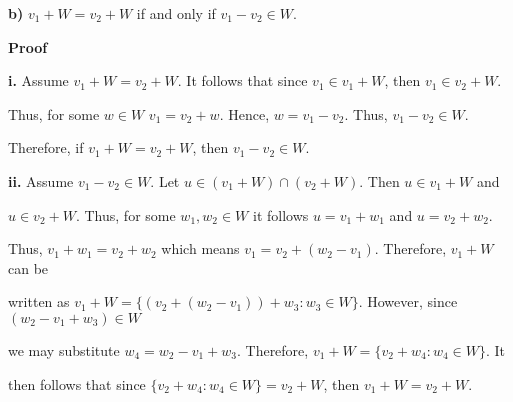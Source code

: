 \documentclass[12pt, a4paper]{article}
\begin{document}
\newpage

\par\textbf{b)} $v_1+W=v_2+W$ if and only if $v_1-v_2\in W$.\par

\vspace{4mm}

\textbf{Proof}\par

\vspace{2mm}

\hspace{4mm}\textbf{i.} Assume $v_1+W=v_2+W$. It follows that since $v_1\in v_1+W$, then $v_1\in v_2+W$.\par Thus, for some $w\in W$ $v_1=v_2+w$. Hence, $w=v_1-v_2$. Thus, $v_1-v_2\in W$.\par Therefore, if $v_1+W=v_2+W$, then $v_1-v_2\in W$.

\vspace{4mm}

\par\hspace{4mm}\textbf{ii.} Assume $v_1-v_2\in W$. Let $u\in(v_1+W)\cap(v_2+W)$. Then $u\in v_1+W$ and\par $u\in v_2+W$. Thus, for some $w_1,w_2\in W$ it follows $u=v_1+w_1$ and $u=v_2+w_2$.\par
Thus, $v_1+w_1=v_2+w_2$ which means $v_1=v_2+(w_2-v_1)$.  Therefore, $v_1+W$ can be\par written as $v_1+W=\{(v_2+(w_2-v_1))+w_3\colon w_3\in W\}$. However, since $(w_2-v_1+w_3)\in W$\par we may substitute $w_4=w_2-v_1+w_3$. Therefore, $v_1+W=\{v_2+w_4\colon w_4\in W\}$. It\par then follows that since $\{v_2+w_4\colon w_4\in W\}=v_2+W$, then $v_1+W=v_2+W$.\hspace{9mm}\blacksquare







 





 
 
 
 
 
 
 
 
 
\end{document}
